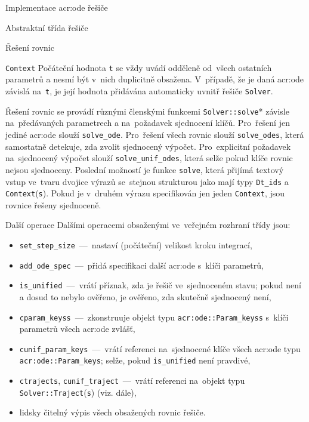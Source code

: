 \documentclass[thesis=M,czech]{FITthesis}[2012/06/26]
\newcommand{\acrlabel}[1]{acr:#1}
\newcommand{\acr}[1]{\acrshort{\acrlabel{#1}}}
\newcommand{\id}[1]{\texttt{#1}}
\begin{document}
\begin{section}{Implementace \acr{ode} řešiče}
\begin{subsection}{Abstraktní třída řešiče}
\begin{subsubsection}{Řešení rovnic}
\begin{paragraph}{\id{Context}}
Počáteční hodnota \id{t} se vždy uvádí
odděleně od~všech ostatních parametrů
a nesmí být v~nich duplicitně obsažena.
V~případě, že je daná \acr{ode}
závislá na~\id{t},
je její hodnota přidávána automaticky
uvnitř řešiče \id{Solver}.
\end{paragraph} %


\bigskip

Řešení rovnic se provádí různými členskými funkcemi
\id{Solver::\-solve}*
závisle na~předávaných parametrech
a na~požadavek sjednocení klíčů.
Pro~řešení jen jediné \acr{ode}
slouží \id{solve\_\-ode}.
Pro~řešení všech rovnic
slouží \id{solve\_\-odes},
která samostatně detekuje,
zda zvolit sjednocený výpočet.
Pro~explicitní požadavek na~sjednocený výpočet
slouží \id{solve\_\-unif\_\-odes},
která selže pokud klíče rovnic nejsou sjednoceny.
Poslední možností je funkce \id{solve},
která přijímá textový vstup
ve~tvaru dvojice výrazů
se~stejnou strukturou jako mají typy
\id{Dt\_\-ids} a \id{Context}(\id{s}).
Pokud je v~druhém výrazu specifikován jen jeden \id{Context},
jsou rovnice řešeny sjednoceně.
\end{subsubsection} %


\begin{subsubsection}{Další operace}\label{sss:impl:ode:solver:op}
Dalšími operacemi obsaženými ve~veřejném rozhraní třídy jsou:
\begin{itemize}
\item \id{set\_\-step\_\-size}~---~nastaví (počáteční)
   velikost kroku integrací,
\item \id{add\_\-ode\_\-spec}~---~přidá specifikaci další \acr{ode}
   s~klíči parametrů,
\item \id{is\_\-unified}~---~vrátí příznak, zda je řešič ve~sjednoceném stavu;
   pokud není a dosud to nebylo ověřeno,
   je ověřeno, zda skutečně sjednocený není,
\item \id{cparam\_\-keyss}~---~zkonstruuje objekt typu
   \id{\acr{ode}::\-Param\_\-keyss} s~klíči parametrů všech \acr{ode} zvlášť,
\item \id{cunif\_\-param\_\-keys}~---~vrátí referenci na~sjednocené klíče
   všech \acr{ode} typu \id{\acr{ode}::\-Param\_\-keys};
   selže, pokud \id{is\_\-unified} není pravdivé,
\item \id{ctrajects}, \id{cunif\_\-traject}~---~vrátí referenci
   na~objekt typu \id{Solver::\-Traject}(\id{s}) (viz. dále),
\item lidsky čitelný výpis všech obsažených rovnic řešiče.
\end{itemize}
\end{subsubsection} %


\end{subsection}
\end{section}
\end{document}

